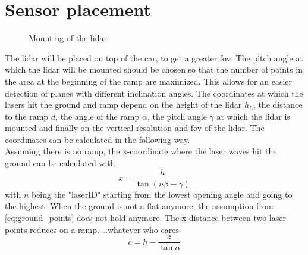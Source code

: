 \section{Sensor placement}
\begin{figure}[htpb]
	\centering
	
	\caption{Mounting of the \gls{lidar}}
	\label{fig:tikz_lidar_mount}
\end{figure}
The \gls{lidar} will be placed on top of the car, to get a greater \gls{fov}.
The pitch angle at which the \gls{lidar} will be mounted should be chosen so that the number of points in the area at the beginning of the ramp are maximized.
This allows for an easier detection of planes with different inclination angles.
The coordinates at which the lasers hit the ground and ramp depend on the height of the \gls{lidar} $ h_\mathrm{L} $, the distance to the ramp $d$, the angle of the ramp $\alpha$, the pitch angle $\gamma$ at which the \gls{lidar} is mounted and finally on the vertical resolution and \gls{fov} of the \gls{lidar}. The coordinates can be calculated in the following way.\\
Assuming there is no ramp, the x-coordinate where the laser waves hit the ground can be calculated with
\begin{equation}
	x = \frac{h}{\tan(n\beta - \gamma)}
	\label{eq:ground_points}
\end{equation}
with $n$ being the "laserID" starting from the lowest opening angle and going to the highest.
When the ground is not a flat anymore, the assumption from \ref{eq:ground_points} does not hold anymore. The x distance between two laser points reduces on a ramp.
\dots whatever who cares
\[ c = h - \frac{z}{\tan \alpha} \]



